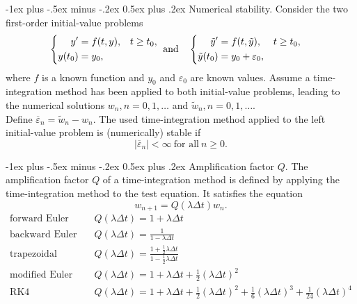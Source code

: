 \documentclass[10pt,landscape,a4paper]{article}
\makeatletter
\renewcommand{\section}{\@startsection{section}{1}{0mm}%
	{-1ex plus -.5ex minus -.2ex}%
	{0.5ex plus .2ex}%
	{\normalfont\large\bfseries}}
\makeatother
\begin{document}
\begin{multicols}{3}
	\section{Numerical stability.}
	Consider the two first-order initial-value problems
	\[
		\begin{cases}
			\begin{aligned}
				y' & =f(t,y), & t\geq t_0, \\ y(t_0)&=y_0,&
			\end{aligned}
		\end{cases}
		\ \mkern-18mu\text{and} \quad
		\begin{cases}
			\begin{aligned}
				\tilde{y}' & =f(t,\tilde{y}), & t\geq t_0, \\ \tilde{y}(t_0)&=y_0+\varepsilon_0,&
			\end{aligned}
		\end{cases}
	\]
	where $ f $ is a known function and $ y_0 $ and $ \varepsilon_0 $ are known values. Assume a time-integration method has been applied to both initial-value problems, leading to the numerical solutions $ w_n, n=0,1,\hdots $ and $ \tilde{w}_n, n=0,1,\hdots $.\\
	Define $ \overline{\varepsilon}_n = \tilde{w}_n-w_n $. The used time-integration method applied to the left initial-value problem is (numerically) stable if
	\[
		|\overline{\varepsilon}_n| < \infty \ \text{for all} \ n\geq0.
	\]
	
	\section{Amplification factor $ Q $.}
	The amplification factor $ Q $ of a time-integration method is defined by applying the time-integration method to the test equation. It satisfies the equation
	\[
		w_{n+1} = Q(\lambda\Delta t)w_n.
	\]
	\begin{align*}
		\text{forward Euler} \quad  & Q(\lambda\Delta t) = 1 + \lambda\Delta t                                                                                                     \\
		\text{backward Euler} \quad & Q(\lambda\Delta t) = \frac{1}{1-\lambda\Delta t}                                                                                             \\
		\text{trapezoidal} \quad    & Q(\lambda\Delta t) = \frac{1+\frac{1}{2}\lambda\Delta t}{1-\frac{1}{2}\lambda\Delta t}                                                       \\
		\text{modified Euler} \quad & Q(\lambda\Delta t) = 1 + \lambda\Delta t + \frac{1}{2}(\lambda\Delta t)^2                                                                    \\
		\text{RK4} \quad            & Q(\lambda\Delta t) = 1 + \lambda\Delta t + \frac{1}{2}(\lambda\Delta t)^2 + \frac{1}{6}(\lambda\Delta t)^3 + \frac{1}{24}(\lambda\Delta t)^4
	\end{align*}
	

\end{multicols}
\end{document}
